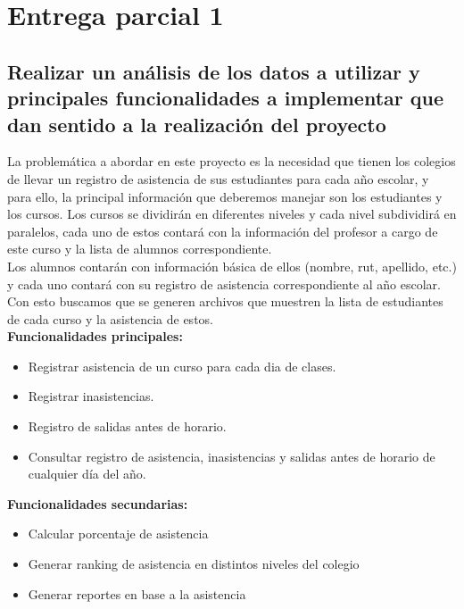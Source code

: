 \section{Entrega parcial 1}

\subsection{Realizar un análisis de los datos a utilizar y principales funcionalidades a  implementar que dan sentido a la realización del proyecto}

La problemática a abordar en este proyecto es la necesidad que tienen los colegios de llevar un registro de asistencia de sus estudiantes para cada año escolar, y para ello, la principal información que deberemos manejar son los estudiantes y los cursos. Los cursos se dividirán en diferentes niveles y cada nivel subdividirá en paralelos, cada uno de estos contará con la información del profesor a cargo de este curso y la lista de alumnos correspondiente.\\

Los alumnos contarán con información básica de ellos (nombre, rut, apellido, etc.) y cada uno contará con su registro de asistencia correspondiente al año escolar.\\

Con esto buscamos que se generen archivos que muestren la lista de estudiantes de cada curso y la asistencia de estos.\\

\textbf{Funcionalidades principales:}
\begin{itemize}
    \item Registrar asistencia de un curso para cada dia de clases.
    \item Registrar inasistencias.
    \item Registro de salidas antes de horario.
    \item Consultar registro de asistencia, inasistencias y  salidas antes de horario de cualquier día del año.
\end{itemize}

\textbf{Funcionalidades secundarias:}
\begin{itemize}
    \item Calcular porcentaje de asistencia
    \item Generar ranking de asistencia en distintos niveles del colegio
    \item Generar reportes en base a la asistencia
\end{itemize}

